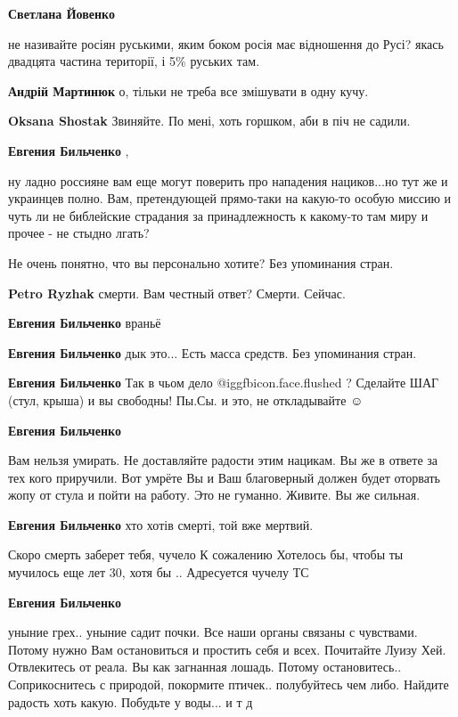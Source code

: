 \begin{itemize}
\begin{itemize}
\textbf{Светлана Йовенко} 

не називайте росіян руськими, яким боком росія має відношення до Русі? якась
двадцята частина території, і 5\% руських там.

\textbf{Андрій Мартинюк} о, тільки не треба все змішувати в одну кучу.

\textbf{Oksana Shostak} Звиняйте. По мені, хоть горшком, аби в піч не садили.

\textbf{Евгения Бильченко} , 

ну ладно россияне вам еще могут поверить про нападения нациков...но тут же и
украинцев полно. Вам, претендующей прямо-таки на какую-то особую миссию и чуть
ли не библейские страдания за принадлежность к какому-то там миру и прочее - не
стыдно лгать?

\end{itemize} %

Не очень понятно, что вы персонально хотите? Без упоминания стран.

\begin{itemize} %
\textbf{Petro Ryzhak} смерти. Вам честный ответ? Смерти. Сейчас.

\textbf{Евгения Бильченко} враньё

\textbf{Евгения Бильченко} дык это... Есть масса средств. Без упоминания стран.

\textbf{Евгения Бильченко} Так в чьом дело @igg{fbicon.face.flushed} ? Сделайте ШАГ (стул, крыша) и вы свободны! Пы.Сы. и это, не откладывайте ☺ ️ 

\textbf{Евгения Бильченко} 

Вам нельзя умирать. Не доставляйте радости этим нацикам. Вы же в ответе за тех
кого приручили. Вот умрёте Вы и Ваш благоверный должен будет оторвать жопу от
стула и пойти на работу. Это не гуманно. Живите. Вы же сильная.


\textbf{Евгения Бильченко} хто хотів смерті, той вже мертвий.

Скоро смерть заберет тебя, чучело
К сожалению
Хотелось бы, чтобы ты мучилось еще лет 30, хотя бы
..
Адресуется чучелу ТС

\textbf{Евгения Бильченко} 

уныние грех.. уныние садит почки. Все наши органы связаны с чувствами. Потому
нужно Вам остановиться и простить себя и всех. Почитайте Луизу Хей. Отвлекитесь
от реала. Вы как загнанная лошадь. Потому остановитесь.. Соприкоснитесь с
природой, покормите птичек.. полубуйтесь чем либо. Найдите радость хоть
какую. Побудьте у воды... и т д


\end{itemize}
\end{itemize}
